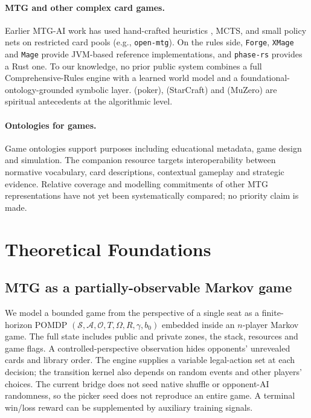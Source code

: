 \documentclass[11pt,a4paper]{article}
\theoremstyle{definition}
\theoremstyle{plain}
\begin{document}
\paragraph{MTG and other complex card games.} Earlier MTG-AI work has used hand-crafted heuristics \citep{cowling2012ensemble}, MCTS, and small policy nets on restricted card pools (e.g., \texttt{open-mtg}). On the rules side, \texttt{Forge}, \texttt{XMage} and \texttt{Mage} provide JVM-based reference implementations, and \texttt{phase-rs} provides a Rust one. To our knowledge, no prior public system combines a full Comprehensive-Rules engine with a learned world model and a foundational-ontology-grounded symbolic layer. \citet{moravvcik2017deepstack} (poker), \citet{vinyals2019grandmaster} (StarCraft) and \citet{schrittwieser2020mastering} (MuZero) are spiritual antecedents at the algorithmic level.

\paragraph{Ontologies for games.} Game ontologies support purposes including educational metadata, game design and simulation. The companion resource \citep{neuburger2026ontology} targets interoperability between normative vocabulary, card descriptions, contextual gameplay and strategic evidence. Relative coverage and modelling commitments of other MTG representations have not yet been systematically compared; no priority claim is made.

\section{Theoretical Foundations}
\label{sec:theory}

\subsection{MTG as a partially-observable Markov game}
We model a bounded game from the perspective of a single seat as a finite-horizon POMDP $(\mathcal{S}, \mathcal{A}, \mathcal{O}, T, \Omega, R, \gamma, b_0)$ embedded inside an $n$-player Markov game. The full state includes public and private zones, the stack, resources and game flags. A controlled-perspective observation hides opponents' unrevealed cards and library order. The engine supplies a variable legal-action set at each decision; the transition kernel also depends on random events and other players' choices. The current bridge does not seed native shuffle or opponent-AI randomness, so the picker seed does not reproduce an entire game. A terminal win/loss reward can be supplemented by auxiliary training signals.
\end{document}
